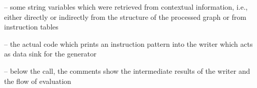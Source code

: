 \begin{description}
  \item {} -- some string variables which were retrieved from contextual information, i.e., either directly or indirectly from the structure of the processed graph or from instruction tables
  \item {} -- the actual code which prints an instruction pattern into the writer which acts as data sink for the generator
  \item {} -- below the call, the comments show the intermediate results of the writer and the flow of evaluation
\end{description}




